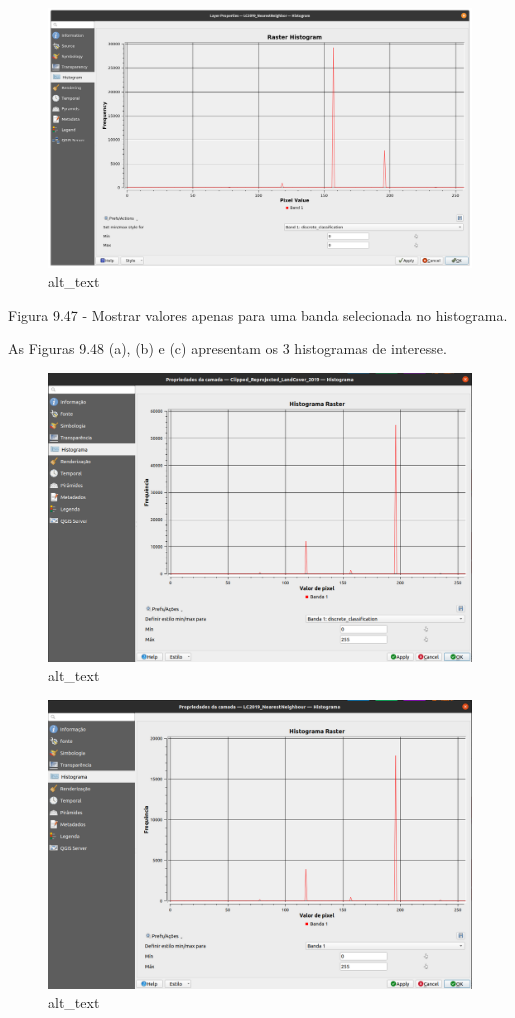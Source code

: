 \documentclass[
  portuguese,
]{krantz}
\begin{document}
\begin{figure}
\centering
\includegraphics{media/modulo9/fig947.png}
\caption{alt\_text}
\end{figure}

Figura 9.47 - Mostrar valores apenas para uma banda selecionada no histograma.

As Figuras 9.48 (a), (b) e (c) apresentam os 3 histogramas de interesse.

\begin{figure}
\centering
\includegraphics{media/modulo9/fig948_a.png}
\caption{alt\_text}
\end{figure}

\begin{figure}
\centering
\includegraphics{media/modulo9/fig948_b.png}
\caption{alt\_text}
\end{figure}
\end{document}
